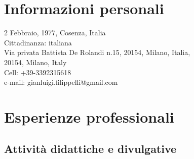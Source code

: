 \section{Informazioni personali}

\begin{flushleft}
	2 Febbraio, 1977, Cosenza, Italia\\
	Cittadinanza: italiana\\
	Via privata Battista De Rolandi n.15, 20154, Milano, Italia,\\
	20154, Milano, Italy\\ 
	Cell: +39-3392315618\\
	e-mail: gianluigi.filippelli@gmail.com\\
\end{flushleft}

\section{Esperienze professionali}
\subsection*{Attivit\`a didattiche e divulgative}


